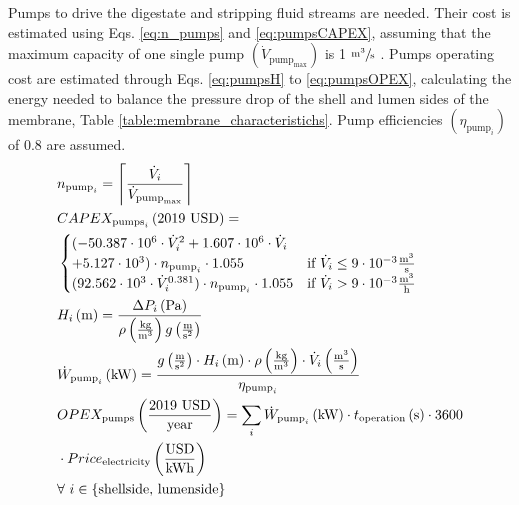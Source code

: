 \begin{refsection}[referencesApD]
Pumps to drive the digestate and stripping fluid streams are needed. Their cost is estimated using Eqs. \ref{eq:n_pumps} and \ref{eq:pumpsCAPEX}, assuming that the maximum capacity of one single pump $\left(\dot{V}_{\text{pump}_{\text{max}}}\right)$ is 1 $\sfrac{\text{m}^3}{\text{s}}$ \citep{peters2003plant}. Pumps operating cost are estimated through Eqs. \ref{eq:pumpsH} to \ref{eq:pumpsOPEX}, calculating the energy needed to balance the pressure drop of the shell and lumen sides of the membrane, Table \ref{table:membrane_characteristichs}. Pump efficiencies $\left(\eta_{\text{pump}_i}\right)$ of 0.8 are assumed.
\begin{align}	
&
n_{\text{pump}_i} = \ceil*{\frac{\dot{V}_i}{\dot{V}_{\text{pump}_{\text{max}}}}} \label{eq:n_pumps}
\\
& CAPEX_{\text{pumps}_i} \left(\text{2019 USD}\right) = \nonumber \\
&
\begin{cases}
(-50.387\cdot10^6 \cdot \dot{V}_i^2 + 1.607\cdot10^6 \cdot \dot{V}_i 
\\
+ 5.127\cdot10^3) \cdot n_{\text{pump}_i} \cdot 1.055 & \text{if } \dot{V}_i \leq 9\cdot10^{-3} \frac{\text{m}^3}{\text{s}}  \\
(92.562\cdot10^3\cdot \dot{V}_i^{0.381}) \cdot n_{\text{pump}_i} \cdot 1.055 & \text{if }  \dot{V}_i > 9\cdot10^{-3} \frac{\text{m}^3}{\text{h}}
\end{cases} \label{eq:pumpsCAPEX} \\ 
& H_i \left(\text{m}\right) = \frac{\Delta P_i \left(\text{Pa}\right)}{\rho \left(\frac{\text{kg}}{\text{m}^3}\right) g\left(\frac{\text{m}}{\text{s}^2}\right)} \label{eq:pumpsH}
\\
& \dot{W}_{\text{pump}_i} \left(\text{kW}\right) = \frac{g\left(\frac{\text{m}}{\text{s}^2}\right) \cdot H_i \left(\text{m}\right) \cdot \rho \left(\frac{\text{kg}}{\text{m}^3}\right) \cdot \dot{V}_i \left(\frac{\text{m}^3}{\text{s}}\right)}{\eta_{\text{pump}_i}} \label{eq:pumpsPower}
\\
& OPEX_{\text{pumps}} \left(\frac{\text{2019 USD}}{\text{year}}\right) = \sum_{i} \dot{W}_{\text{pump}_i} \left(\text{kW}\right) \cdot t_{\text{operation}} \left(\text{s}\right) \cdot 3600 \nonumber \\
& \cdot Price_{\text{electricity}}\left(\frac{\text{USD}}{\text{kWh}}\right) \label{eq:pumpsOPEX}
\\
& \forall \ i  \in \{\text{shellside, lumenside}\} \nonumber 
\end{align}


\end{refsection}
